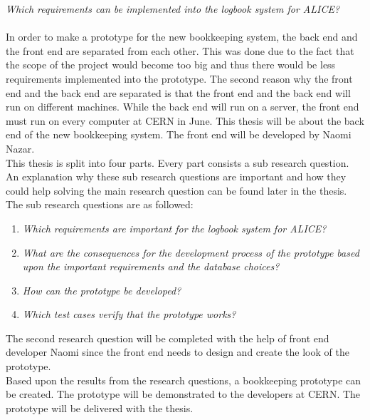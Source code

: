 \documentclass[paper=a4, fontsize=11pt,twoside]{scrartcl}	%
\begin{document}
\textit{Which requirements can be implemented into the logbook system for ALICE?}
\\ \\
In order to make a prototype for the new bookkeeping system, the back end and the front end are separated from each other. This was done due to the fact that the scope of the project would become too big and thus there would be less requirements implemented into the prototype. The second reason why the front end and the back end are separated is that the front end and the back end will run on different machines. While the back end will run on a server, the front end must run on every computer at CERN in June. This thesis will be about the back end of the new bookkeeping system. The front end will be developed by Naomi Nazar.
\\ 
This thesis is split into four parts. Every part consists a sub research question. An explanation why these sub research questions are important and how they could help solving the main research question can be found later in the thesis. The sub research questions are as followed: \\
\begin{enumerate}
\item \textit{Which requirements are important for the logbook system for ALICE?}
\item \textit{What are the consequences for the development process of the prototype based upon the important requirements and the database choices?}
\item \textit{How can the prototype be developed?}
\item \textit{Which test cases verify that the prototype works?}
\end{enumerate}
The second research question will be completed with the help of front end developer Naomi since the front end needs to design and create the look of the prototype. \\
Based upon the results from the research questions, a bookkeeping prototype can be created. The prototype will be demonstrated to the developers at CERN. The prototype will be delivered with the thesis. 

 

\end{document}
